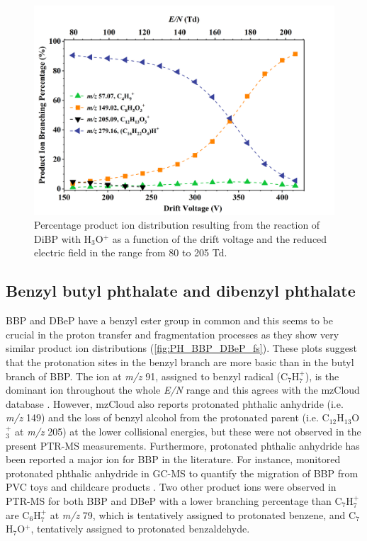 \begin{figure}[htb]%
\centering
\includegraphics[height=0.35\textheight]{pics/DiBP-BR.png}
\caption{Percentage product ion distribution resulting from the reaction of DiBP with H$_3$O$^+$ as a function of the drift voltage and the reduced electric field in the range from 80 to 205 Td.}
\label{fig:PH_DiBP_fs}
\end{figure}





\subsection{Benzyl butyl phthalate
and dibenzyl phthalate}

BBP and DBeP have a benzyl ester group in common and this seems to be crucial in the proton transfer and fragmentation processes as they show very similar product ion distributions (\autoref{fig:PH_BBP_DBeP_fs}). 
These plots suggest that the protonation sites in the benzyl branch are more basic than in the butyl branch  of BBP.
%
The ion at \textit{m/z} 91, assigned to benzyl radical (C$_7$H$_7^+$), is the dominant ion throughout the whole \textit{E/N} range and this agrees with the mzCloud database \cite{mzcloudBBP}.
%
However, mzCloud also reports protonated phthalic anhydride (i.e. \textit{m/z} 149) and the loss of benzyl alcohol from the protonated parent (i.e. C$_{12}$H$_{13}$O$_3^+$ at \textit{m/z} 205) at the lower collisional energies, but these were not observed in the present PTR-MS measurements. 
%
Furthermore, protonated phthalic anhydride has been reported a major ion for BBP in the literature. For instance, \citeauthor{earls2003gas} monitored protonated phthalic anhydride  in GC-MS to quantify the migration of BBP from PVC toys and childcare products \cite{earls2003gas}.
%
Two other product ions were observed in PTR-MS for both BBP and DBeP with a lower branching percentage than C$_7$H$_7^+$ are
C$_6$H$_7^+$ at \textit{m/z} 79, which is tentatively assigned to protonated benzene, 
and C$_7$H$_7$O$^+$, tentatively assigned to protonated benzaldehyde.

